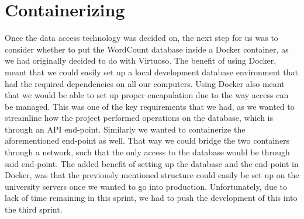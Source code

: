 \section{Containerizing}
Once the data access technology was decided on, the next step for us was to consider whether to put the WordCount database inside a Docker container, as we had originally decided to do with Virtuoso. The benefit of using Docker, meant that we could easily set up a local development database environment that had the required dependencies on all our computers. Using Docker also meant that we would be able to set up proper encapulation due to the way access can be managed. This was one of the key requirements that we had, as we wanted to streamline how the \knox{} project performed operations on the database, which is through an API end-point. 
Similarly we wanted to containerize the aforementioned end-point as well. That way we could bridge the two containers through a network, such that the only access to the database would be through said end-point.
The added benefit of setting up the database and the end-point in Docker, was that the previously mentioned structure could easily be set up on the university servers once we wanted to go into production.
Unfortunately, due to lack of time remaining in this sprint, we had to push the development of this into the third sprint.